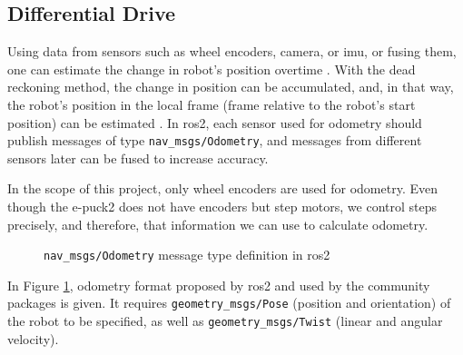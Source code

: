 \subsection{Differential Drive}
\label{sec:simulation:odometry_velocity}

Using data from sensors such as wheel encoders, camera, or \ac{imu}, or fusing them, one can estimate the change in robot's position overtime \cite{shen_localization_2011, nister_visual_2004}.
With the dead reckoning method, the change in position can be accumulated, and, in that way, the robot's position in the local frame (frame relative to the robot's start position) can be estimated \cite{ben-ari_elements_2018, astolfi_exponential_1999}.
In \ac{ros2}, each sensor used for odometry should publish messages of type \texttt{nav\_msgs/Odometry}, and messages from different sensors later can be fused to increase accuracy. 

In the scope of this project, only wheel encoders are used for odometry.
Even though the e-puck2 does not have encoders but step motors, we control steps precisely, and therefore, that information we can use to calculate odometry.

\begin{figure}[H]
    \centering
    \begin{subfigure}[b]{0.9\textwidth}
    \end{subfigure}
    \caption{\texttt{nav\_msgs/Odometry} message type definition in \ac{ros2}}
    \label{fig:simulation:odometry}
\end{figure}

In Figure \ref{fig:simulation:odometry}, odometry format proposed by \ac{ros2} and used by the community packages is given. It requires \texttt{geometry\_msgs/Pose} (position and orientation) of the robot to be specified, as well as \texttt{geometry\_msgs/Twist} (linear and angular velocity).

